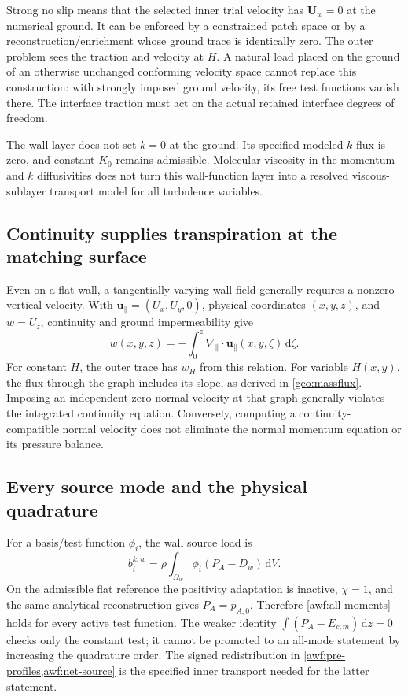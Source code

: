 \documentclass[11pt,a4paper]{article}
\numberwithin{equation}{section}
\newcommand{\dd}{\mathrm d}
\begin{document}
Strong no slip means that the selected inner trial velocity has
$\boldsymbol U_w=0$ at the numerical ground.  It can be enforced by
a constrained patch space or by a reconstruction/enrichment whose
ground trace is identically zero.  The outer problem sees the
traction and velocity at $H$.  A natural load placed on the ground
of an otherwise unchanged conforming velocity space cannot replace
this construction: with strongly imposed ground velocity, its free
test functions vanish there.  The interface traction must act on
the actual retained interface degrees of freedom.

The wall layer does not set $k=0$ at the ground.  Its specified
modeled $k$ flux is zero, and constant $K_0$ remains admissible.
Molecular viscosity in the momentum and $k$ diffusivities does not
turn this wall-function layer into a resolved viscous-sublayer
transport model for all turbulence variables.

\subsection{Continuity supplies transpiration at the matching surface}

Even on a flat wall, a tangentially varying wall field generally
requires a nonzero vertical velocity.  With
$\boldsymbol u_\parallel=(U_x,U_y,0)$, physical coordinates $(x,y,z)$,
and $w=U_z$, continuity and ground impermeability give
\begin{equation}
 w(x,y,z)=-\int_0^z
 \nabla_\parallel\cdot\boldsymbol u_\parallel(x,y,\zeta)
 \,\dd\zeta .
 \label{geo:flat-transpiration}
\end{equation}
For constant $H$, the outer trace has $w_H$ from this relation.
For variable $H(x,y)$, the flux through the graph includes its slope,
as derived in \cref{geo:massflux}.  Imposing an independent zero
normal velocity at that graph generally violates the integrated
continuity equation.  Conversely, computing a continuity-compatible
normal velocity does not eliminate the normal momentum equation or
its pressure balance.

\subsection{Every source mode and the physical quadrature}

For a basis/test function $\phi_i$, the wall source load is
\begin{equation}
 b_i^{k,w}=\rho\int_{\Omega_w}\phi_i(P_A-D_w)\,\dd V.
 \label{geo:wall-load}
\end{equation}
On the admissible flat reference the positivity adaptation is
inactive, $\chi=1$, and the same analytical reconstruction gives
$P_A=p_{A,0}$.  Therefore \cref{awf:all-moments} holds for every
active test function.  The weaker identity
$\int(P_A-E_{c,m})\,\dd z=0$ checks only the constant test; it
cannot be promoted to an all-mode statement by increasing the
quadrature order.  The signed redistribution in
\cref{awf:pre-profiles,awf:net-source} is the specified inner transport
needed for the latter statement.
\end{document}

